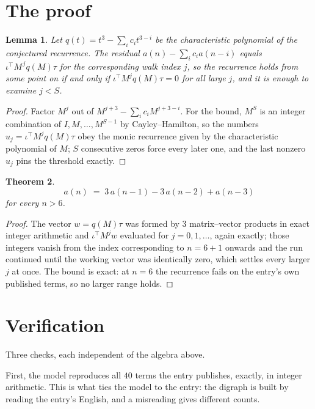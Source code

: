 \documentclass[11pt,a4paper]{article}
\theoremstyle{plain}
\newtheorem{theorem}{Theorem}
\newtheorem{lemma}[theorem]{Lemma}
\theoremstyle{definition}
\begin{document}
\section{The proof}

\begin{lemma}\label{lem:crit}
Let $q(t)=t^{3}-\sum_i c_it^{3-i}$ be the characteristic polynomial of the
conjectured recurrence. The residual $a(n)-\sum_ic_ia(n-i)$ equals
$\iota^{\!\top}M^{\,j}q(M)\tau$ for the corresponding walk index $j$, so the recurrence
holds from some point on if and only if $\iota^{\!\top}M^{j}q(M)\tau=0$ for all large $j$,
and it is enough to examine $j<S$.
\end{lemma}

\begin{proof}
Factor $M^{j}$ out of $M^{j+3}-\sum_ic_iM^{j+3-i}$. For the bound, $M^{S}$
is an integer combination of $I,M,\dots,M^{S-1}$ by Cayley--Hamilton, so the numbers
$u_j=\iota^{\!\top}M^{j}q(M)\tau$ obey the monic recurrence given by the characteristic
polynomial of $M$; $S$ consecutive zeros force every later one, and the last nonzero $u_j$
pins the threshold exactly.
\end{proof}

\begin{theorem}
\[
a(n)\;=\;3\,a(n-1) - 3\,a(n-2) + a(n-3)
\]
for every $n>6$.
\end{theorem}

\begin{proof}
The vector $w=q(M)\tau$ was formed by $3$ matrix--vector products in exact integer
arithmetic and $\iota^{\!\top}M^{j}w$ evaluated for $j=0,1,\dots$, again exactly; those
integers vanish from the index corresponding to $n=6+1$ onwards and the run continued
until the working vector was identically zero, which settles every larger $j$ at once. The bound is exact: at $n=6$ the recurrence fails on the entry's own published terms, so no larger range holds.
\end{proof}

\section{Verification}

Three checks, each independent of the algebra above.

First, the model reproduces all $40$ terms the entry publishes, exactly, in integer
arithmetic. This is what ties the model to the entry: the digraph is built by reading the
entry's English, and a misreading gives different counts.
\end{document}
